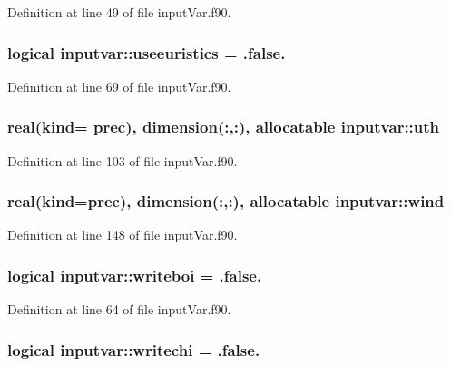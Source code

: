 Definition at line 49 of file input\-Var.\-f90.

\hypertarget{classinputvar_a04f11d38b133803024202cc546abddc3}{
\subsubsection[{useeuristics}]{\setlength{\rightskip}{0pt plus 5cm}logical inputvar\-::useeuristics = .false.}}\label{classinputvar_a04f11d38b133803024202cc546abddc3}


Definition at line 69 of file input\-Var.\-f90.

\hypertarget{classinputvar_abd9a09032c8d997c45cd49020fb78609}{
\subsubsection[{uth}]{\setlength{\rightskip}{0pt plus 5cm}real(kind= prec), dimension(\-:,\-:), allocatable inputvar\-::uth}}\label{classinputvar_abd9a09032c8d997c45cd49020fb78609}


Definition at line 103 of file input\-Var.\-f90.

\hypertarget{classinputvar_a984abc6260080087c3c555784481627d}{
\subsubsection[{wind}]{\setlength{\rightskip}{0pt plus 5cm}real(kind=prec), dimension(\-:,\-:), allocatable inputvar\-::wind}}\label{classinputvar_a984abc6260080087c3c555784481627d}


Definition at line 148 of file input\-Var.\-f90.

\hypertarget{classinputvar_adfc2c014d1631c831bd700d9ff13dcff}{
\subsubsection[{writeboi}]{\setlength{\rightskip}{0pt plus 5cm}logical inputvar\-::writeboi = .false.}}\label{classinputvar_adfc2c014d1631c831bd700d9ff13dcff}


Definition at line 64 of file input\-Var.\-f90.

\hypertarget{classinputvar_a6e34f329672526cc9e682125013ce5e7}{
\subsubsection[{writechi}]{\setlength{\rightskip}{0pt plus 5cm}logical inputvar\-::writechi = .false.}}\label{classinputvar_a6e34f329672526cc9e682125013ce5e7}


